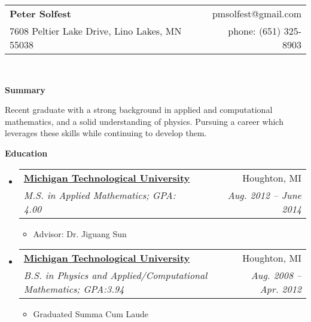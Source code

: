 \documentclass[letterpaper,11pt]{article}
\makeatletter
\newcommand{\resitem}[1]{\item #1 \vspace{-2pt}}
\newcommand{\resheading}[1]{{\large \textbf{#1}}}
\newcommand{\ressubheading}[4]{
\begin{tabular*}{6.5in}{l@{\extracolsep{\fill}}r}
		\textbf{#1} & #2 \\
		\textit{#3} & \textit{#4} \\
\end{tabular*}\vspace{-6pt}}
\makeatother
\begin{document}
\newcommand{\mywebheader}{
\begin{tabular*}{7in}{l@{\extracolsep{\fill}}r}
	\textbf{\LARGE Peter Solfest} & pmsolfest@gmail.com\\
	{\footnotesize 7608 Peltier Lake Drive, Lino Lakes, MN 55038} & phone: (651) 325-8903 \\
	\end{tabular*}
\\
\vspace{0.1in}}

\mywebheader

\resheading{Summary}
  
  Recent graduate with a strong background in applied and computational mathematics,
  and a solid understanding of physics.
  Pursuing a career which leverages these skills while continuing to develop them.

  \vspace{0.1in}
\resheading{Education}
	\begin{itemize}
		\item
			\ressubheading{\href{www.mtu.edu}{Michigan Technological University}}{Houghton, MI}{M.S. in Applied Mathematics; GPA: 4.00}{Aug. 2012 -- June 2014}
				{ \footnotesize
				\begin{itemize}
					\resitem{Advisor: Dr. Jiguang Sun} 
				\end{itemize}
				}
		\item
			\ressubheading{\href{www.mtu.edu}{Michigan Technological University}}{Houghton, MI}{B.S. in Physics and Applied/Computational Mathematics; GPA:3.94}{Aug. 2008 -- Apr. 2012}
				{ \footnotesize
				\begin{itemize}
					\resitem{Graduated Summa Cum Laude} 
				\end{itemize}
				}
\begin{comment}%
		\item
			\ressubheading{\href{http://www.isd12.org/chs/}{Centennial High School}}{Circle Pines, MN}{GPA:3.79}{Sep. 2003 - June 2008}
				{ \footnotesize
				\begin{itemize}
				\resitem{Graduated with honors}
				\end{itemize}
				}
\end{comment}
	\end{itemize} %
\end{document}
